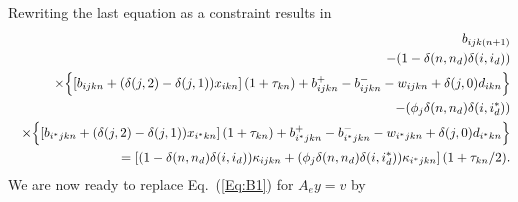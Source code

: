 \documentclass{article}[fleqn,12pt]
\begin{document}
Rewriting the last equation as a constraint results in
\begin{eqnarray}
	&&b_{ijk(n+1)} 
	  \nonumber  \\
	&& - (1 - \delta(n, n_d)\delta(i, i_d)) \nonumber\\
	&& \times \Bigl\{ \left[b_{ijkn} + (\delta(j, 2) - \delta(j, 1))x_{ikn}\right](1 + \tau_{kn}) + b^+_{ijkn} - b^-_{ijkn} - w_{ijkn} + \delta(j, 0)d_{ikn} \Bigr\}
	\nonumber \\
	&&- (\phi_j\delta(n, n_d)\delta(i, i_d^*)) \nonumber \\
	&& \times \Bigl\{ \left[b_{i^*jkn} + (\delta(j, 2) - \delta(j, 1))x_{i^*kn}\right](1 + \tau_{kn}) + b^+_{i^*jkn} - b^-_{i^*jkn} - w_{i^*jkn} + \delta(j, 0)d_{i^*kn} \Bigr\}
	\nonumber \\
	&&= \left[ (1 - \delta(n, n_d)\delta(i, i_d)) 
	\kappa_{ijkn} + (\phi_j\delta(n, n_d)\delta(i, i^*_d))
	\kappa_{i^*jkn}\right](1 + \tau_{kn}/2). \nonumber  \\
\end{eqnarray}
We are now ready to replace Eq.~(\ref{Eq:B1}) for $A_ey = v$ by
\end{document}

